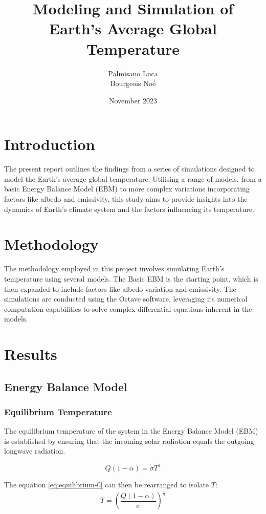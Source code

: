 \documentclass[12pt]{article}
\title{Modeling and Simulation of Earth's Average Global Temperature}
\author{Palmisano Luca \\ Bourgeois Noé}
\date{November 2023}
\begin{document}
\maketitle
\newpage

\section{Introduction}
The present report outlines the findings from a series of simulations designed to model the Earth's average global temperature. Utilising a range of models, from a basic Energy Balance Model (EBM) to more complex variations incorporating factors like albedo and emissivity, this study aims to provide insights into the dynamics of Earth's climate system and the factors influencing its temperature.

\section{Methodology}
The methodology employed in this project involves simulating Earth's temperature using several models. The Basic EBM is the starting point, which is then expanded to include factors like albedo variation and emissivity. The simulations are conducted using the Octave software, leveraging its numerical computation capabilities to solve complex differential equations inherent in the models.

\section{Results}

\subsection{Energy Balance Model}

\subsubsection{Equilibrium Temperature}
The equilibrium temperature of the system in the Energy Balance Model (EBM) is established by ensuring that the incoming solar radiation equals the outgoing longwave radiation\cite{kaper-2013-math-ac-equilibrium}.

\begin{equation} \label{eq:equilibrium-0}
Q(1 - \alpha) = \sigma T^4
\end{equation}

\noindent The equation \ref{eq:equilibrium-0} can then be rearranged to isolate $T$:
\begin{equation} \label{eq:equilibrium-1}
T = \left( \frac{Q(1 - \alpha)}{\sigma} \right)^{\frac{1}{4}}
\end{equation}
\end{document}
